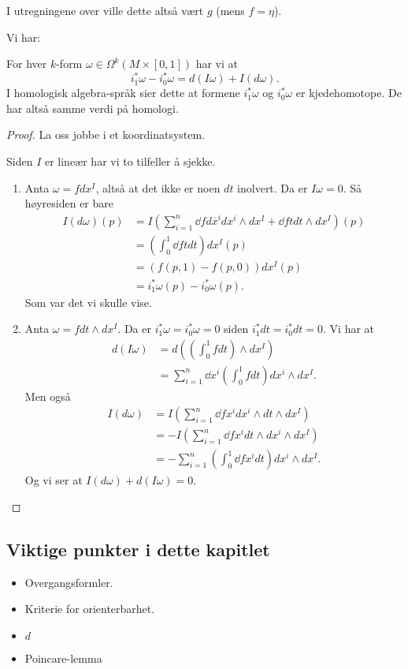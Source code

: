 \documentclass[11pt, english]{article}
\begin{document}
I utregningene over ville dette altså vært $g$ (mens $f=\eta$).

Vi har:

\begin{prop}
  For hver $k$-form $\omega \in \Omega^k(M \times [0,1])$ har vi at
\[
i_1^\ast  \omega - i_0^\ast \omega = d(I\omega) + I(d\omega).
\]
I homologisk algebra-språk sier dette at formene $i_1^\ast \omega$ og $i_0^\ast \omega$ er kjedehomotope. De har altså samme verdi på homologi.
\end{prop}

\begin{proof}
 La oss jobbe i et koordinatsystem.

Siden $I$ er lineær har vi to tilfeller å sjekke.
\begin{enumerate}
\item Anta $\omega = f dx^I$, altså at det ikke er noen $dt$ inolvert. Da er $I\omega = 0$. Så høyresiden er bare
\begin{align*}
I(d \omega)(p) &= I\left(\sum_{i=1}^n \dd{f}{d \overline x^i} dx^i \wedge dx^I + \dd{f}{t} dt \wedge dx^I \right)(p) \\
&= \left(\int_0^1 \dd{f}{t} dt  \right) dx^I(p) \\
&= (f(p,1)-f(p,0)) dx^I(p) \\
&= i_1^\ast \omega(p) - i_0^\ast \omega(p).
\end{align*}
Som var det vi skulle vise.
\item Anta $\omega = f dt \wedge dx^I$. Da er $i_1^\ast \omega=i_0^\ast \omega = 0$ siden $i_1^\ast dt = i_0^\ast dt = 0$. Vi har at
  \begin{align*}
d(I\omega) &= d((\int_0^1 f dt) \wedge dx^I) \\
&= \sum_{i=1}^n \dd{}{x^i} \left( \int_0^1 f   dt\right) dx^i \wedge dx^I.
  \end{align*}
Men også
\begin{align*}
I(d \omega) &= I(\sum_{i=1}^n \dd{f}{x^i} dx^i \wedge dt \wedge dx^I) \\
&= - I(\sum_{i=1}^n \dd{f}{x^i} dt \wedge  dx^i \wedge dx^I) \\
&= -\sum_{i=1}^n \left( \int_0^1 \dd{f}{x^i} dt\right) dx^i \wedge dx^I .
\end{align*}
Og vi ser at $I(d\omega) + d(I\omega) =0$.
\end{enumerate}
\end{proof}



\subsection{Viktige punkter i dette kapitlet}
\begin{itemize}
\item Overgangsformler.
\item Kriterie for orienterbarhet.
\item $d$
\item Poincare-lemma
\end{itemize}
\end{document}
